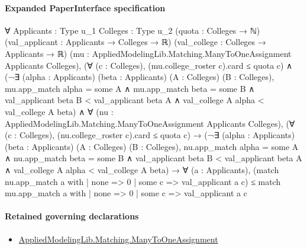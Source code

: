 \documentclass[10pt]{article}
\begin{document}
\paragraph{Expanded PaperInterface specification}
\begin{ReviewVerbatim}
∀ {Applicants : Type u_1} {Colleges : Type u_2} (quota : Colleges → ℕ) (val_applicant : Applicants → Colleges → ℝ)
  (val_college : Colleges → Applicants → ℝ) (mu : AppliedModelingLib.Matching.ManyToOneAssignment Applicants Colleges),
  (∀ (c : Colleges), (mu.college_roster c).card ≤ quota c) ∧
    (¬∃ (alpha : Applicants) (beta : Applicants) (A : Colleges) (B : Colleges),
          mu.app_match alpha = some A ∧
            mu.app_match beta = some B ∧
              val_applicant beta B < val_applicant beta A ∧ val_college A alpha < val_college A beta) ∧
      ∀ (nu : AppliedModelingLib.Matching.ManyToOneAssignment Applicants Colleges),
        (∀ (c : Colleges), (nu.college_roster c).card ≤ quota c) →
          (¬∃ (alpha : Applicants) (beta : Applicants) (A : Colleges) (B : Colleges),
                nu.app_match alpha = some A ∧
                  nu.app_match beta = some B ∧
                    val_applicant beta B < val_applicant beta A ∧ val_college A alpha < val_college A beta) →
            ∀ (a : Applicants),
              (match nu.app_match a with
                | none => 0
                | some c => val_applicant a c) ≤
                match mu.app_match a with
                | none => 0
                | some c => val_applicant a c
\end{ReviewVerbatim}

\paragraph{Retained governing declarations}
\begin{itemize}\raggedright
\item \hyperlink{governing-declaration-5f205dc5e20311a8}{Applied\allowbreak{}Modeling\allowbreak{}Lib.\allowbreak{}Matching.\allowbreak{}Many\allowbreak{}To\allowbreak{}One\allowbreak{}Assignment}
\end{itemize}
\end{document}
